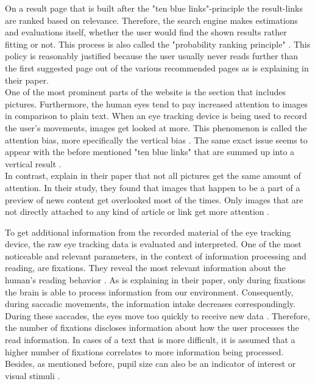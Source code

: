 On a result page that is built after the "ten blue links"-principle the result-links are ranked based on relevance. Therefore, the search engine makes estimations and evaluations itself, whether the user would find the shown results rather fitting or not. This process is also called the "probability ranking principle" \autocite{wang2016beyond}. This policy is reasonably justified because the user usually never reads further than the first suggested page out of the various recommended pages as \textcite{lewandowski2015evaluating} is explaining in their paper.\\
One of the most prominent parts of the website is the section that includes pictures. Furthermore, the human eyes tend to pay increased attention to images in comparison to plain text. When an eye tracking device is being used to record the user's movements,  images get looked at more. This phenomenon is called the attention bias, more specifically the vertical bias \autocite{wang2016beyond}.
The same exact issue seems to appear with the before mentioned "ten blue links" that are summed up into a vertical result \autocite{wang2016beyond}.\\
In contrast, \textcite{liu2015influence} explain in their paper that not all pictures get the same amount of attention. In their study, they found that images that happen to be a part of a preview of news content get overlooked most of the times. Only images that are not directly attached to any kind of article or link get more attention \autocite{liu2015influence}.

To get additional information from the recorded material of the eye tracking device, the raw eye tracking data is evaluated and interpreted. One of the most noticeable and relevant parameters, in the context of information processing and reading, are fixations. They reveal the most relevant information about the human's reading behavior \autocite{pan2007google}. As \textcite{rayner1998eye} is explaining in their paper, only during fixations the brain is able to process information from our environment. Consequently, during saccadic movements, the information intake decreases correspondingly. During these saccades, the eyes move too quickly to receive new data \autocite{rayner1998eye}. 
Therefore, the number of fixations discloses information about how the user processes the read information. In cases of a text that is more difficult, it is assumed that a higher number of fixations correlates to more information being processed. Besides, as mentioned before, pupil size can also be an indicator of interest or visual stimuli \autocite{pan2007google}.

